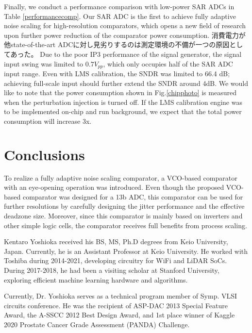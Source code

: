 \documentclass[letterpaper, 10 pt, conference]{ieeeconf}  %
\begin{document}
Finally, we conduct a performance comparison with low-power SAR ADCs in Table \ref{performancecomp}. Our SAR ADC is the first to achieve fully adaptive noise scaling for high-resolution comparators, which opens a new field of research upon further power reduction of the comparator power consumption. 
消費電力が他state-of-the-art ADCに対し見劣りするのは測定環境の不備が一つの原因としてあった。
Due to the poor IP3 performance of the signal generator, the signal input swing was limited to $0.7V_{pp}$, which only occupies half of the SAR ADC input range. Even with LMS calibration, the SNDR was limited to 66.4 dB; achieving full-scale input should further extend the SNDR around 4dB. We would like to note that the power consumption shown in Fig.\ref{chipphoto} is measured when the perturbation injection is turned off. If the LMS calibration engine was to be implemented on-chip and run background, we expect that the total power consumption will increase 3x. 

\section{Conclusions}
To realize a fully adaptive noise scaling comparator, a VCO-based comparator with an eye-opening operation was introduced.  Even though the proposed VCO-based comparator was designed for a 13b ADC, this comparator can be used for further resolutions by carefully designing the jitter performance and the effective deadzone size. Moreover, since this comparator is mainly based on inverters and other simple logic cells, the comparator receives full benefits from process scaling. %





\begin{IEEEbiography}
{Kentaro Yoshioka}
received his BS, MS, Ph.D degrees from Keio University, Japan. Currently, he is an Assistant Professor at Keio University. He worked with Toshiba during 2014-2021, developing circuitry for WiFi and LiDAR SoCs. During 2017-2018, he had been a visiting scholar at Stanford University, exploring efficient machine learning hardware and algorithms. 

Currently, Dr. Yoshioka serves as a technical program member of Symp. VLSI circuits conference. He was the recipient of ASP-DAC 2013 Special Feature Award, the A-SSCC 2012 Best Design Award, and 1st place winner of Kaggle 2020 Prostate Cancer Grade Assessment (PANDA) Challenge.
\end{IEEEbiography}
\end{document}
